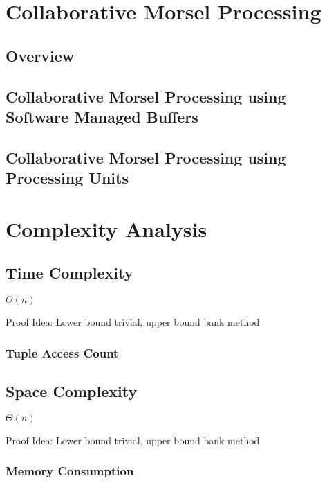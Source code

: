 \section{Collaborative Morsel Processing}
\subsection{Overview}
\subsection{Collaborative Morsel Processing using Software Managed Buffers}
\subsection{Collaborative Morsel Processing using Processing Units}

\section{Complexity Analysis}
\subsection{Time Complexity}
$\Theta(n)$

Proof Idea: Lower bound trivial, upper bound bank method
\subsubsection{Tuple Access Count}
\subsection{Space Complexity}
$\Theta(n)$

Proof Idea: Lower bound trivial, upper bound bank method
\subsubsection{Memory Consumption}
